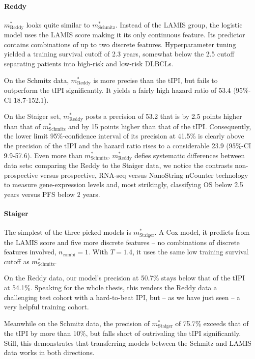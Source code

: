 \paragraph{Reddy}
$m^*_\text{Reddy}$ looks quite similar to $m^*_\text{Schmitz}$. Instead of the LAMIS group, the 
logistic model uses the LAMIS score making it its only continuous feature. Its predictor contains 
combinations of up to two discrete features. Hyperparameter tuning yielded a training survival 
cutoff of \num{2.3} years, somewhat below the \num{2.5} cutoff separating patients into high-risk 
and low-risk DLBCLs. 

On the Schmitz data, $m^*_\text{Reddy}$ is more precise than the tIPI, but fails to outperform the 
tIPI significantly. It yields a fairly high hazard ratio of \num{53.4} 
(\num{95}\%-CI \num{18.7}-\num{152.1}).

On the Staiger set, $m^*_\text{Reddy}$ posts a precision of \num{53.2} that is by \num{2.5} 
points higher than that of $m^*_\text{Schmitz}$ and by \num{15} points higher than that of the tIPI. 
Consequently, the lower limit \num{95}\%-confidence interval of its precision at \num{41.5}\% is 
clearly above the precision of the tIPI and the hazard ratio rises to a considerable \num{23.9}
(\num{95}\%-CI \num{9.9}-\num{57.6}). Even more than $m^*_\text{Schmitz}$, $m^*_\text{Reddy}$ 
defies systematic differences between data sets: comparing the Reddy to the Staiger data, we 
notice the contrasts non-prospective versus prospective, 
RNA-seq versus NanoString nCounter technology to measure gene-expression levels and, most strikingly, 
classifying OS below \num{2.5} years versus PFS below \num{2} years.

\paragraph{Staiger}
The simplest of the three picked models is $m^*_\text{Staiger}$. A Cox model, it predicts from 
the LAMIS score and five more discrete features -- no combinations of discrete features involved, 
$n_\text{combi} = 1$. With $T = \num{1.4}$, it uses the same low training survival cutoff as 
$m^*_\text{Schmitz}$.

On the Reddy data, our model's precision at \num{50.7}\% stays below that of the tIPI at \num{54.1}\%. 
Speaking for the whole thesis, this renders the Reddy data a challenging test cohort with a 
hard-to-beat IPI, but -- as we have just seen -- a very helpful training cohort.

Meanwhile on the Schmitz data, the precision of $m^*_\text{Staiger}$ of \num{75.7}\% exceeds that 
of the tIPI by more than \num{10}\%, but falls short of outrivaling the tIPI significantly. Still, 
this demonstrates that transferring models between the Schmitz and LAMIS data works in both 
directions.

